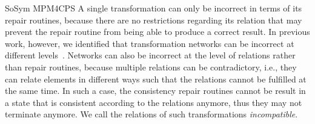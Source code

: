 \begin{copiedFrom}{SoSym MPM4CPS}
A single transformation can only be incorrect in terms of its repair routines, because there are no restrictions regarding its relation that may prevent the repair routine from being able to produce a correct result.
In previous work, however, we identified that transformation networks can be incorrect at different levels~\cite{klare2019icmt}.
Networks can also be incorrect at the level of relations rather than repair routines, because multiple relations can be contradictory, i.e., they can relate elements in different ways such that the relations cannot be fulfilled at the same time.
In such a case, the consistency repair routines cannot be result in a state that is consistent according to the relations anymore, thus they may not terminate anymore.
We call the relations of such transformations \emph{incompatible}.


\end{copiedFrom}
